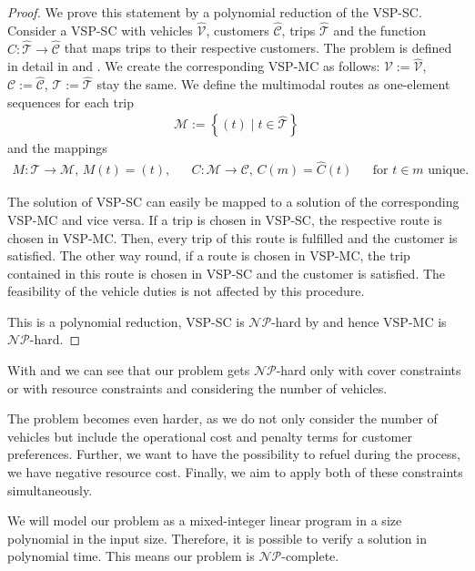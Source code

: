\begin{proof}

We prove this statement by a polynomial reduction of the VSP-SC. Consider a VSP-SC with vehicles $\hat{\mathcal{V}}$, customers $\hat{\mathcal{C}}$, trips $\hat{\mathcal{T}}$ and the function $\hat{C}:\hat{\mathcal{T}}\to\hat{\mathcal{C}}$ that maps trips to their respective customers. The problem is defined in detail in \cite{Kaiser} and \cite{Knoll}. We create the corresponding VSP-MC as follows: $\mathcal{V}:=\hat{\mathcal{V}}$, $\mathcal{C}:=\hat{\mathcal{C}}$, $\mathcal{T}:=\hat{\mathcal{T}}$ stay the same. We define the multimodal routes as one-element sequences for each trip
\begin{align*}
	\mathcal{M}:=\left\{(t)\mid t\in\hat{\mathcal{T}}\right\}
\end{align*}
and the mappings
\begin{align*}
	M:\mathcal{T}\to\mathcal{M} \text{, } M(t) = (t), && C:\mathcal{M}\to\mathcal{C} \text{, } C(m) = \hat{C}(t) && \text{for } t\in m \text{ unique.}
\end{align*}

The solution of VSP-SC can easily be mapped to a solution of the corresponding VSP-MC and vice versa. If a trip is chosen in VSP-SC, the respective route is chosen in VSP-MC. Then, every trip of this route is fulfilled and the customer is satisfied. The other way round, if a route is chosen in VSP-MC, the trip contained in this route is chosen in VSP-SC and the customer is satisfied. The feasibility of the vehicle duties is not affected by this procedure.

This is a polynomial reduction, VSP-SC is $\mathcal{NP}$-hard by  and hence VSP-MC is $\mathcal{NP}$-hard.

\end{proof}

With  and  we can see that our problem gets $\mathcal{NP}$-hard only with cover constraints or with resource constraints and considering the number of vehicles.

The problem becomes even harder, as we do not only consider the number of vehicles but include the operational cost and penalty terms for customer preferences. Further, we want to have the possibility to refuel during the process, \ie we have negative resource cost. Finally, we aim to apply both of these constraints simultaneously. 

We will model our problem as a mixed-integer linear program in a size polynomial in the input size. Therefore, it is possible to verify a solution in polynomial time. This means our problem is $\mathcal{NP}$-complete.

